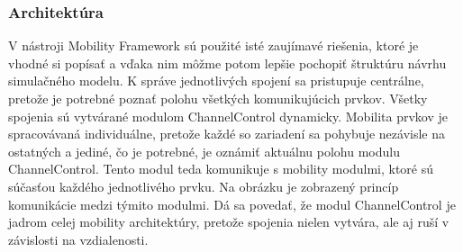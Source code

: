 \subsubsection{Architektúra}
\indent\indent V nástroji Mobility Framework sú použité isté zaujímavé riešenia, ktoré je vhodné si popísať a vďaka nim môžme potom lepšie pochopiť štruktúru návrhu simulačného modelu. K správe jednotlivých spojení sa pristupuje centrálne, pretože je potrebné poznať polohu všetkých komunikujúcich prvkov. Všetky spojenia sú vytvárané modulom \ttfamily ChannelControl \rmfamily dynamicky. Mobilita prvkov je spracovávaná individuálne, pretože každé so zariadení sa pohybuje nezávisle na ostatných a jediné, čo je potrebné, je oznámiť aktuálnu polohu modulu \ttfamily ChannelControl\rmfamily. Tento modul teda komunikuje s mobility modulmi, ktoré sú súčasťou každého jednotlivého prvku. Na obrázku je zobrazený princíp komunikácie medzi týmito modulmi. Dá sa povedať, že modul \ttfamily ChannelControl \rmfamily je jadrom celej mobility architektúry, pretože spojenia nielen vytvára, ale aj ruší v závislosti na vzdialenosti.\\
